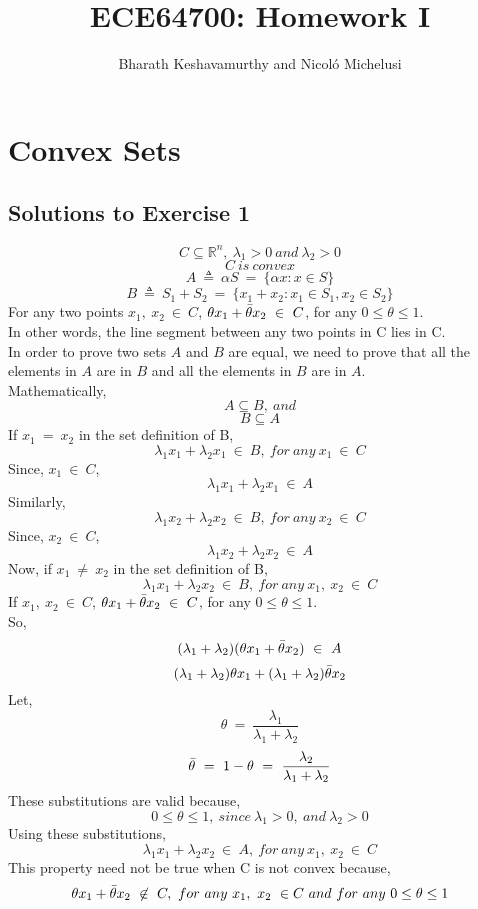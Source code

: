 \documentclass[12pt, draftcls, onecolumn]{IEEEtran}
\begin{document}
 
\title{ECE64700: Homework I}
\author{Bharath Keshavamurthy and Nicol{\'o} Michelusi}
\maketitle
{}
\section{Convex Sets}
\subsection{Solutions to Exercise 1}
\[C \subseteq \mathbb{R}^n,\ \lambda_1 > 0\ and\ \lambda_2 > 0\]
\[C\ is\ convex\]
\[A\ \triangleq\ \alpha S\ =\ \{\alpha x: x \in S\}\]
\[B\ \triangleq\ S_1+S_2\ =\ \{x_1+x_2: x_1 \in S_1, x_2 \in S_2\}\]
For any two points $x_1,\ x_2\ \in\ C$, $\theta x_1+ \Bar{\theta} x_2\ \in\ C$, for any $0 \leq \theta \leq 1$. 
\\In other words, the line segment between any two points in C lies in C.
\\In order to prove two sets $A$ and $B$ are equal, we need to prove that all the elements in $A$ are in $B$ and all the elements in $B$ are in $A$. \\Mathematically,
\[A \subseteq B,\ and\]
\[B \subseteq A\]
If $x_1\ =\ x_2$ in the set definition of B,
\[\lambda_1 x_1 + \lambda_2 x_1\ \in\ B,\ for\ any\ x_1\ \in\ C\]
Since, $x_1\ \in\ C$,
\[\lambda_1 x_1 + \lambda_2 x_1\ \in\ A\]
Similarly,
\[\lambda_1 x_2 + \lambda_2 x_2\ \in\ B,\ for\ any\ x_2\ \in\ C\]
Since, $x_2\ \in\ C$,
\[\lambda_1 x_2 + \lambda_2 x_2\ \in\ A\]
Now, if $x_1\ \neq\ x_2$ in the set definition of B,
\[\lambda_1 x_1 + \lambda_2 x_2\ \in\ B,\ for\ any\ x_1,\ x_2\ \in\ C\]
If $x_1,\ x_2\ \in\ C$, $\theta x_1+ \Bar{\theta} x_2\ \in\ C$, for any $0 \leq \theta \leq 1$. 
\\So, 
\[(\lambda_1+\lambda_2)(\theta x_1+ \Bar{\theta} x_2)\ \in\ A\]
\[(\lambda_1+\lambda_2)\theta x_1+(\lambda_1+\lambda_2)\Bar{\theta} x_2\]
Let,
\[\theta\ =\ \frac{\lambda_1}{\lambda_1+\lambda_2}\]
\[\Bar{\theta}\ =\ 1-\theta\ =\ \frac{\lambda_2}{\lambda_1+\lambda_2}\]
These substitutions are valid because,
\[0\leq \theta \leq 1,\ since\ \lambda_1 > 0,\ and\ \lambda_2 > 0\]
Using these substitutions,
\[\lambda_1 x_1 + \lambda_2 x_2\ \in\ A,\ for\ any\ x_1,\ x_2\ \in\ C\]
This property need not be true when C is not convex because,
\[\theta x_1+ \Bar{\theta} x_2\ \not\in\ C,\ for\ any\ x_1,\ x_2\ \in C\ and\ for\ any\ 0 \leq \theta \leq 1\]
\end{document}
